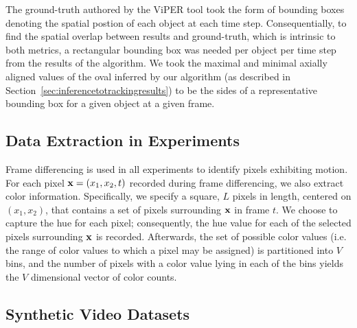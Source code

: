 \documentclass{article}
\begin{document}
The ground-truth authored by the ViPER tool took the form of bounding boxes denoting the spatial postion of each object at each time step. Consequentially, to find the spatial overlap between results and ground-truth, which is intrinsic to both metrics, a rectangular bounding box was needed per object per time step from the results of the algorithm. We took the maximal and minimal axially aligned values of the oval inferred by our algorithm (as described in Section~\ref{sec:inferencetotrackingresults}) to be the sides of a representative bounding box for a given object at a given frame.



\subsection{Data Extraction in Experiments}
\label{sec:dataextractioninexperiments}

Frame differencing is used in all experiments to identify pixels exhibiting motion. 
For each pixel $\bold{x} = ( x_{1}, x_{2}, t )$ recorded during frame differencing, we also extract color information. Specifically, we specify a square, $L$ pixels in length, centered on $(x_{1}, x_{2})$, that contains a set of pixels surrounding $\bold{x}$ in frame $t$. We choose to capture the hue for each pixel; consequently, the hue value for each of the selected pixels surrounding $\bold{x}$ is recorded. Afterwards, the set of possible color values (i.e. the range of color values to which a pixel may be assigned) is partitioned into $V$ bins, and the number of pixels with a color value lying in each of the bins yields the $V$ dimensional vector of color counts.



\subsection{Synthetic Video Datasets}
\label{sec:syntheticvideodatasets}
\end{document}
